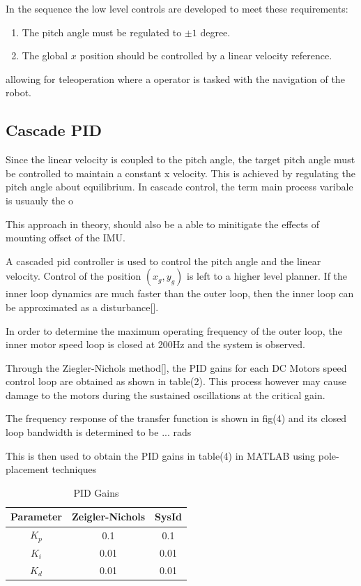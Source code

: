         In the sequence the low level controls are developed to meet these requirements:
        \begin{enumerate}
            \item The pitch angle must be regulated to $±1$ degree.
            \item The global $x$ position should be controlled by a linear velocity reference.
        \end{enumerate}
        allowing for teleoperation where a operator is tasked with the navigation of the robot. 




     

        \subsection{Cascade PID}
        Since the linear velocity is coupled to the
        pitch angle, the target pitch angle must be controlled to maintain a constant x velocity. 
        This is achieved by regulating the pitch angle about equilibrium. In cascade control, the term main process varibale 
        is usuauly the o

        This approach in theory, should also be a able to minitigate the effects of mounting offset of the IMU. 

        A cascaded pid controller is used to control the pitch angle and the linear velocity. 
        Control of the position $(x_g,y_g)$ is left to a higher level planner.  
        If the inner loop dynamics are much faster than the outer loop, 
        then the inner loop can be approximated as a disturbance[].

        In order to determine the maximum operating frequency of the outer loop, 
        the inner motor speed loop is closed at 200Hz and the system is observed.
        
        Through the Ziegler-Nichols method[], the PID gains for each DC Motors speed control loop 
        are obtained as shown in table(2). This process however may cause damage to the motors 
        during the sustained oscillations at the critical gain. 
       
        The frequency response of the transfer function is shown in fig(4) 
        and its closed loop bandwidth is determined to be ... rads

        This is then used to obtain the PID gains in table(4) in MATLAB using pole-placement techniques
        \begin{table}[H]
            \centering
            \begin{tabular}{|c|c|c|}
                \hline
                Parameter & Zeigler-Nichols & SysId \\
                \hline 
                $K_p$ & 0.1 & 0.1 \\
                $K_i$ & 0.01 & 0.01 \\
                $K_d$ & 0.01 & 0.01 \\
                \hline
            \end{tabular}
            \caption{PID Gains}
        \end{table}

